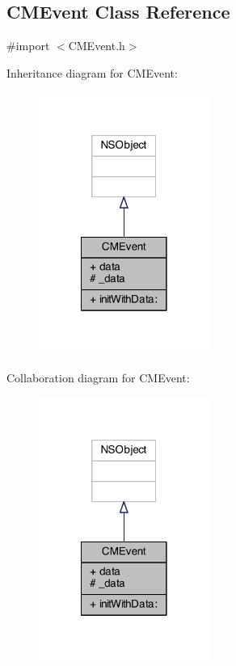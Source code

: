 \subsection{C\-M\-Event Class Reference}
\label{interface_c_m_event}


{\ttfamily \#import $<$C\-M\-Event.\-h$>$}



Inheritance diagram for C\-M\-Event\-:
\nopagebreak
\begin{figure}[H]
\begin{center}
\leavevmode
\includegraphics[width=158pt]{interface_c_m_event__inherit__graph}
\end{center}
\end{figure}


Collaboration diagram for C\-M\-Event\-:
\nopagebreak
\begin{figure}[H]
\begin{center}
\leavevmode
\includegraphics[width=158pt]{interface_c_m_event__coll__graph}
\end{center}
\end{figure}
